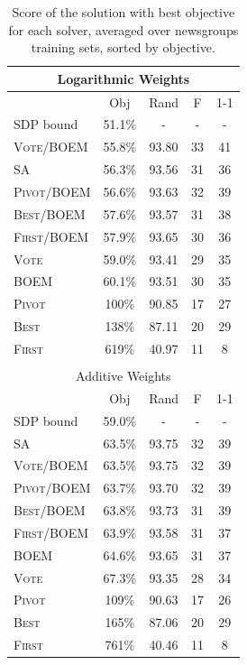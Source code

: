 \documentclass[11pt]{article}
\newcommand{\alg}[1]{\textsc{#1}}
\begin{document}
\begin{table}[bt!]
\begin{tabular}{l|c|c|c|c}
\multicolumn{5}{c}{Logarithmic Weights}
\\ \hline
 & Obj & Rand & F & 1-1
\\ \hline
SDP bound & 51.1\% & - & - & - 
\\ \hline
\alg{Vote}/\alg{BOEM} & 55.8\% & 93.80 & 33 & 41
\\ 
SA & 56.3\% & 93.56 & 31 & 36
\\ 
\alg{Pivot}/\alg{BOEM} & 56.6\% & 93.63 & 32 & 39
\\ 
\alg{Best}/\alg{BOEM} & 57.6\% & 93.57 & 31 & 38
\\ 
\alg{First}/\alg{BOEM} & 57.9\% & 93.65 & 30 & 36
\\ 
\alg{Vote} & 59.0\% & 93.41 & 29 & 35
\\ 
\alg{BOEM} & 60.1\% & 93.51 & 30 & 35
\\ 
\alg{Pivot} & 100\% & 90.85 & 17 & 27
\\ 
\alg{Best} & 138\% & 87.11 & 20 & 29
\\ 
\alg{First} & 619\% & 40.97 & 11 & 8
\\ 
\multicolumn{5}{c}{}\\
\multicolumn{5}{c}{Additive Weights}
\\ \hline
 & Obj & Rand & F & 1-1
\\ \hline
SDP bound & 59.0\% & - & - & -
\\ \hline
SA & 63.5\% & 93.75 & 32 & 39
\\ 
\alg{Vote}/\alg{BOEM} & 63.5\% & 93.75 & 32 & 39
\\ 
\alg{Pivot}/\alg{BOEM} & 63.7\% & 93.70 & 32 & 39
\\ 
\alg{Best}/\alg{BOEM} & 63.8\% & 93.73 & 31 & 39
\\ 
\alg{First}/\alg{BOEM} & 63.9\% & 93.58 & 31 & 37
\\ 
\alg{BOEM} & 64.6\% & 93.65 & 31 & 37
\\ 
\alg{Vote} & 67.3\% & 93.35 & 28 & 34
\\ 
\alg{Pivot} & 109\% & 90.63 & 17 & 26
\\ 
\alg{Best} & 165\% & 87.06 & 20 & 29
\\ 
\alg{First} & 761\% & 40.46 & 11 & 8
\\ 
\end{tabular}
\caption{Score of the solution with best objective for
  each solver, averaged over newsgroups training sets, sorted by objective.}
\label{newsgroup-results}
\end{table}
\end{document}
